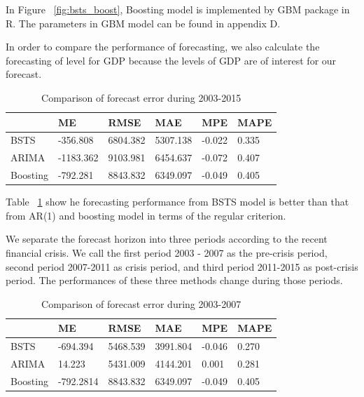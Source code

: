 In Figure ~\ref{fig:bsts_boost}, Boosting model is implemented by GBM package in R.  The parameters in GBM model can be found in appendix D.


In order to compare the performance of forecasting, we also calculate the forecasting of level for GDP because the levels of GDP are of interest for our forecast.  

\begin{table}[h]
	\centering
	\begin{tabular}{@{}llllll@{}}
		\toprule
		& ME          & RMSE      & MAE       & MPE       & MAPE     \\ \midrule
		BSTS          & -356.808 &  6804.382 &  5307.138 &  -0.022 &  0.335 \\
		ARIMA         & -1183.362 & 9103.981 & 6454.637 & -0.072 & 0.407  \\ 
		Boosting      & -792.281 &  8843.832 &  6349.097 &  -0.049 &  0.405\\ \bottomrule
	\end{tabular}
	\caption{Comparison of forecast error during 2003-2015}
	\label{ErrorCom}
\end{table}

Table ~\ref{ErrorCom} show he forecasting performance from BSTS model is better than that from AR(1) and boosting model in terms of the regular criterion. 


We separate the forecast horizon into three periods according to the recent financial crisis. We call the first period 2003 - 2007 as the pre-crisis period, second period 2007-2011 as crisis period, and third period  2011-2015 as post-crisis period. The performances of these three methods change during those periods.

\begin{table}[h]
	\centering
	\begin{tabular}{@{}llllll@{}}
		\toprule
		& ME          & RMSE      & MAE       & MPE       & MAPE     \\ \midrule
		BSTS          & -694.394 & 5468.539 & 3991.804 & -0.046 & 0.270 \\
		ARIMA         & 14.223 & 5431.009 & 4144.201 & 0.001 & 0.281  \\ 
		Boosting      & -792.2814 & 8843.832 & 6349.097 & -0.049 & 0.405\\ \bottomrule
	\end{tabular}
	\caption{Comparison of forecast error during 2003-2007}
	\label{ErrorCom1}
\end{table}


